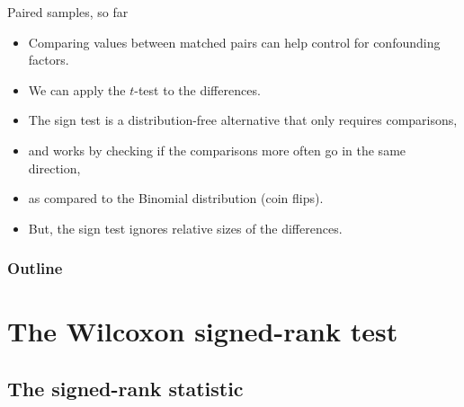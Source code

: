 %
%
%




\date{29 October 2015}



\begin{frame}
  \maketitle
\end{frame}

\begin{frame}{Paired samples, so far}

    \begin{itemize}
        \item Comparing values between matched pairs 
            can help control for confounding factors.
        \item We can apply the $t$-test to the \alert{differences}.
        \item The \alert{sign test} is a distribution-free alternative
            that only requires comparisons,
        \item and works by checking if the comparisons more often go in the same direction,
        \item as compared to the Binomial distribution (coin flips).
        \item But, the sign test ignores relative sizes of the differences.
    \end{itemize}

\end{frame}

\begin{frame}\frametitle<presentation>{Outline}
  \tableofcontents
\end{frame}

\section{The Wilcoxon signed-rank test}

\subsection{The signed-rank statistic}

